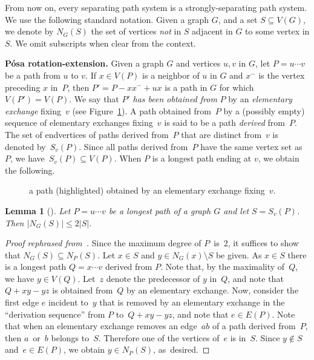 \documentclass{aic}
\newcommand{\defi}[1]{\emph{#1}}
\newtheorem{lemma}[theorem]{Lemma}
\begin{document}
From now on, every separating path system is a strongly-separating path system.
We use the following standard notation.
Given a graph \(G\), and  a set \(S\subseteq V(G)\),
we denote by \(N_G(S)\) the set of vertices \emph{not} in $S$ adjacent in \(G\) to some vertex in \(S\).
We omit subscripts when clear from the context.



\medskip
\noindent\textbf{Pósa rotation-extension.}
Given a graph $G$ and vertices $u, v$ in \(G\), let \(P = u \cdots v\) be a path from $u$ to $v$.
If \(x\in V(P)\) is a neighbor of \(u\) in \(G\)
and \(x^-\) is the vertex preceding \(x\) in~\(P\),
then \(P' = P-xx^- + ux\) is a path in \(G\) for which \(V(P') = V(P)\).
We say that \(P'\) \defi{has been obtained from} \(P\) by an
\defi{elementary exchange} fixing~\(v\) (see Figure~\ref{fig:rotation}).
A path obtained from~\(P\) by a (possibly empty) sequence of elementary exchanges fixing~\(v\)
is said to be a path \defi{derived} from~\(P\).
The set of endvertices of paths derived from~\(P\) that are distinct from~\(v\) is denoted by~\(S_v(P)\).
Since all paths derived from~\(P\) have the same vertex set as~\(P\), we have~\(S_v(P) \subseteq V(P)\).
When \(P\) is a longest path ending at \(v\), we obtain the following.

\begin{figure}[t]
          \begin{center}
            
            \caption{a path (highlighted)
              obtained by an elementary exchange fixing~\(v\).
            }\label{fig:rotation}
          \end{center}
\end{figure}




\begin{lemma}[\cite{brandt2006global}]\label{lemma:brandt}
  Let  \(P = u \cdots v\) be a longest path of a graph $G$
  and let \(S = S_v(P)\). Then \(|N_G(S)| \leq 2|S|\).
\end{lemma}


\begin{proof}[{Proof rephrased from~{\cite[Lemma 2.6]{brandt2006global}}}]
  Since the maximum degree of \(P\)~is~\(2\), it suffices to show  that \(N_G(S) \subseteq N_P(S)\).
  Let \(x\in S\) and \(y\in N_G(x)\setminus S\) be given.
  As \(x\in S\) there is a longest path \(Q = x \cdots v\) derived from \(P\).
  Note that, by the maximality of~\(Q\), we have $y\in V(Q)$.
  Let~\(z\) denote the predecessor of \(y\) in~\(Q\),
  and note that \(Q + xy - yz\) is obtained from~\(Q\) by an elementary exchange.
  Now, consider the first edge \(e\) incident to~\(y\) that is removed by
  an elementary exchange in the ``derivation sequence'' from \(P\) to~\(Q + xy - yz\),
  and note that \(e\in E(P)\).
  Note that when an elementary exchange removes an edge~\(ab\) of a path derived from~\(P\),
  then \(a\)~or~\(b\) belongs to~\(S\).
  Therefore one of the vertices of~$e$ is in~$S$. Since $y \not\in S$ and~$e \in E(P)$,
  we obtain \(y\in N_P(S)\), as~desired.
\end{proof}
\end{document}
